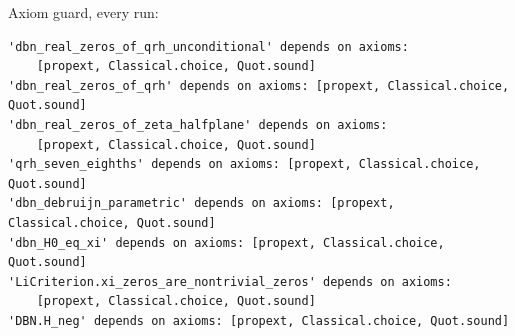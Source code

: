 \documentclass[11pt]{article}
\theoremstyle{definition}
\begin{document}
Axiom guard, every run:
\begin{verbatim}
'dbn_real_zeros_of_qrh_unconditional' depends on axioms:
    [propext, Classical.choice, Quot.sound]
'dbn_real_zeros_of_qrh' depends on axioms: [propext, Classical.choice, Quot.sound]
'dbn_real_zeros_of_zeta_halfplane' depends on axioms:
    [propext, Classical.choice, Quot.sound]
'qrh_seven_eighths' depends on axioms: [propext, Classical.choice, Quot.sound]
'dbn_debruijn_parametric' depends on axioms: [propext, Classical.choice, Quot.sound]
'dbn_H0_eq_xi' depends on axioms: [propext, Classical.choice, Quot.sound]
'LiCriterion.xi_zeros_are_nontrivial_zeros' depends on axioms:
    [propext, Classical.choice, Quot.sound]
'DBN.H_neg' depends on axioms: [propext, Classical.choice, Quot.sound]
\end{verbatim}
\end{document}
